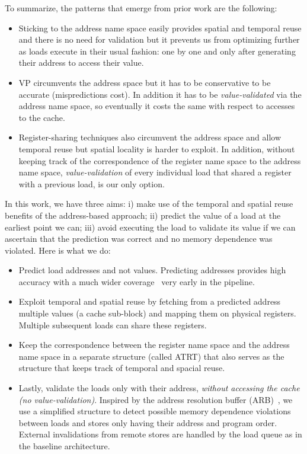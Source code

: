 \documentclass{sig-alternate}
\begin{document}
To summarize, the patterns that emerge from prior work are the following:
\begin{itemize}
\item Sticking to the address name space easily provides spatial and temporal reuse and there is no need for validation but it prevents us from optimizing further as loads execute in their usual fashion: one by one and only after generating their address to access their value.
\item VP circumvents the address space but it has to be conservative to be accurate (mispredictions cost). In addition it has to be \emph{value-validated} via the address name space, so eventually it costs the same with respect to accesses to the cache.
\item Register-sharing techniques also circumvent the address space and allow temporal reuse but spatial locality is harder to exploit. In addition, without keeping track of the correspondence of the register name space to the address name space, \emph{value-validation} of every individual load that shared a register with a previous load, is our only option.
\end{itemize}
In this work, we have three aims: i) make use of the temporal and spatial reuse benefits of the address-based approach; ii) predict the value of a load at the earliest point we can; iii) avoid executing the load to validate its value if we can ascertain that the prediction was correct and no memory dependence was violated.
Here is what we do:
\begin{itemize}
\item Predict load addresses and not values. Predicting addresses provides high accuracy with a much wider coverage~\cite{} very early in the pipeline.
\item Exploit temporal and spatial reuse by fetching from a predicted address multiple values (a cache sub-block) and mapping them on physical registers. Multiple subsequent loads can share these registers.
\item Keep the correspondence between the register name space and the address name space in a separate structure (called ATRT) that also serves as the structure that keeps track of temporal and spacial reuse.
\item Lastly, validate the loads only with their address, \emph{without accessing the cache (no value-validation)}. 
Inspired by the address resolution buffer (ARB)~\cite{franklin-sohi96}, we use a simplified structure to detect possible memory dependence violations between loads and stores only having their address and program order. External invalidations from remote stores are handled by the load queue as in the baseline architecture.
\end{itemize}
\end{document}
